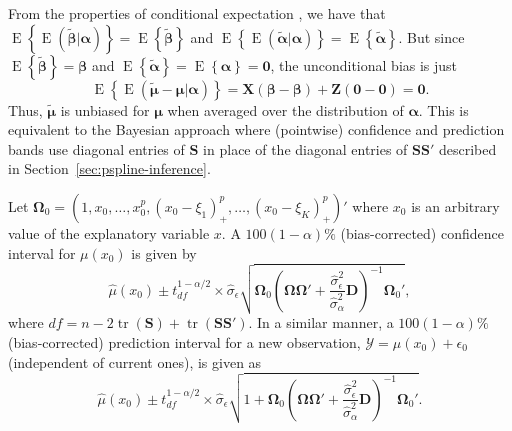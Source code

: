 \documentclass[cmfont,usenames,dvipsnames,leqno]{afit-etd}\usepackage[]{graphicx}\usepackage[]{color}
\newcommand{\mc}[1]{\ensuremath{\mathcal{#1}}}
\newcommand{\wh}[1]{\ensuremath{\widehat{#1}}}
\newcommand{\wt}[1]{\ensuremath{\widetilde{#1}}}
\newcommand{\E}{\operatorname{E}}
\newcommand{\tr}{\operatorname{tr}}
\begin{document}
From the properties of conditional expectation \citep[pg. 164]{casella_statistical_2002}, we have that $\E\left\{\E\left(\wt{\bm{\beta}}|\bm{\alpha}\right)\right\} = \E\left\{\wt{\bm{\beta}}\right\}$ and $\E\left\{\E\left(\wt{\bm{\alpha}}|\bm{\alpha}\right)\right\} = \E\left\{\wt{\bm{\alpha}}\right\}$. But since $\E\left\{\wt{\bm{\beta}}\right\} = \bm{\beta}$ and $\E\left\{\wt{\bm{\alpha}}\right\} = \E\left\{\bm{\alpha}\right\} = \bm{0}$, the unconditional bias is just 
\begin{equation*}
  \E\left\{\E\left(\wt{\bm{\mu}} - \bm{\mu}|\bm{\alpha}\right)\right\} = \bm{X}\left(\bm{\beta} - \bm{\beta}\right) + \bm{Z}\left(\bm{0} - \bm{0}\right) = \bm{0}. 
\end{equation*}
Thus, $\wt{\bm{\mu}}$ is unbiased for $\bm{\mu}$ when averaged over the distribution of $\bm{\alpha}$. This is equivalent to the Bayesian approach where (pointwise) confidence and prediction bands use diagonal entries of $\bm{S}$ in place of the diagonal entries of $\bm{S}\bm{S}'$ described in Section~\ref{sec:pspline-inference}.

Let $\bm{\Omega}_0 = \left(1, x_0, \dotsc, x_0^p, (x_0 - \xi_1)_+^p, \dotsc, (x_0 - \xi_K)_+^p\right)'$ where $x_0$ is an arbitrary value of the explanatory variable $x$. A $100(1 - \alpha)\%$ (bias-corrected) confidence interval for $\mu(x_0)$ is given by
\begin{equation*}
  \wh{\mu}(x_0) \pm t_{df}^{1 - \alpha/2} \times \wh{\sigma}_\epsilon\sqrt{\bm{\Omega}_0\left(\bm{\Omega}\bm{\Omega}' + \frac{\wh{\sigma}_\epsilon^2}{\wh{\sigma}_\alpha^2}\bm{D} \right)^{-1}\bm{\Omega}_0'},
\end{equation*}
where $df = n - 2\tr\left(\bm{S}\right) + \tr\left(\bm{S}\bm{S}'\right)$. In a similar manner, a $100(1 - \alpha)\%$ (bias-corrected) prediction interval for a new observation, $\mc{Y} = \mu(x_0) + \epsilon_0$ (independent of current ones), is given as
\begin{equation}
\label{eqn:bias-corrected-pi}
  \wh{\mu}(x_0) \pm t_{df}^{1 - \alpha/2} \times \wh{\sigma}_\epsilon\sqrt{1 + \bm{\Omega}_0\left(\bm{\Omega}\bm{\Omega}' + \frac{\wh{\sigma}_\epsilon^2}{\wh{\sigma}_\alpha^2}\bm{D} \right)^{-1}\bm{\Omega}_0'}.
\end{equation}
\end{document}
